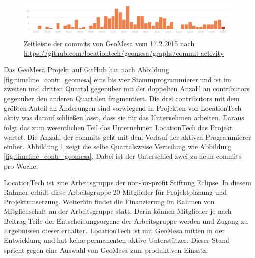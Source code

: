 \begin{figure}[h!]
\centering
\includegraphics[width=\textwidth]{Abbildungen/geomesa_timeline_commits.png}
\caption[Zeitleiste der commits von GeoMesa]{Zeitleiste der commits von GeoMesa vom 17.2.2015 nach \url{https://github.com/locationtech/geomesa/graphs/commit-activity}}
\label{fig:timeline_commits_geomesa}
\end{figure}
Das GeoMesa Projekt auf GitHub hat nach Abbildung \ref{fig:timeline_contr_geomesa} eins bis vier Stammprogrammierer und ist im zweiten und dritten Quartal gegenüber mit der doppelten Anzahl an contributors gegenüber den anderen Quartalen fragmentiert.
Die drei contributors mit dem größten Anteil an Änderungen sind vorwiegend in Projekten von LocationTech aktiv was darauf schließen lässt, dass sie für das Unternehmen arbeiten.
Daraus folgt das zum wesentlichen Teil das Unternehmen LocationTech das Projekt wartet.
Die Anzahl der commits geht mit dem Verlauf der aktiven Programmierer einher.
Abbildung \ref{fig:timeline_commits_geomesa} zeigt die selbe Quartalsweise Verteilung wie Abbildung \ref{fig:timeline_contr_geomesa}.
Dabei ist der Unterschied zwei zu neun commits pro Woche.

LocationTech ist eine Arbeitsgruppe der non-for-profit Stiftung Eclipse.
In diesem Rahmen erhält diese Arbeitsgruppe 20 Mitglieder für Projektplanung und Projektumsetzung.
Weiterhin findet die Finanzierung im Rahmen von Mitgliedschaft an der Arbeitsgruppe statt.
Darin können Mitglieder je nach Beitrag Teile der Entscheidungsorgane der Arbeitsgruppe werden und Zugang zu Ergebnissen dieser erhalten. \cite{website:locationtech-about}
LocationTech ist mit GeoMesa mitten in der Entwicklung und hat keine permanenten aktive Unterstützer.
Dieser Stand spricht gegen eine Auswahl von GeoMesa zum produktiven Einsatz.

